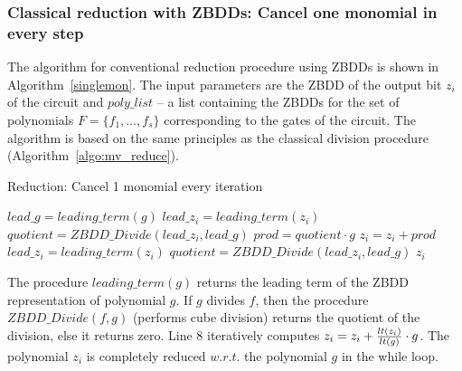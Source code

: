 \subsubsection{Classical reduction with ZBDDs: Cancel one monomial in
  every step} 

The algorithm for conventional reduction procedure using ZBDDs is
shown in Algorithm~\ref{singlemon}. The input parameters are the ZBDD
of the output bit $z_i$ of the circuit and $poly\_list$ -- a list
containing the ZBDDs for the set of polynomials $F =
\{f_1,\dots,f_s\}$ corresponding to the
gates of the circuit. The algorithm is based on the same principles as
the classical division procedure (Algorithm~\ref{algo:mv_reduce}). 




\begin{algorithm}
\caption{Reduction: Cancel 1 monomial every iteration}
\label{singlemon}
\begin{algorithmic}[1]
{\small
{}
\State $lead\_g = leading\_term(g)$
\State $lead\_z_i = leading\_term(z_i)$
\State $quotient = ZBDD\_Divide(lead\_z_i,lead\_g)$
\State $prod = quotient \cdot g$
\State $z_i = z_i + prod$
\State $lead\_z_i = leading\_term(z_i)$
\State $quotient = ZBDD\_Divide(lead\_z_i,lead\_g)$
\EndWhile
\EndFor
\State \Return $z_i$
\EndProcedure
}
\end{algorithmic}
\end{algorithm}

The procedure $leading\_term(g)$ returns the leading term of 
the ZBDD representation of polynomial $g$. 
If $g$ divides $f$, then the procedure $ZBDD\_Divide(f,g)$ (performs cube division) returns the quotient of the
division,  else it returns zero. Line 8 iteratively computes $z_i = z_i +
{lt(z_i) \over lt(g)}\cdot g$. The polynomial $z_i$ is completely reduced
$w.r.t.$ the polynomial $g$ in the while loop. 

